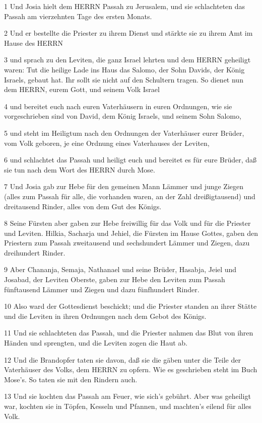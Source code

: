 \par 1 Und Josia hielt dem HERRN Passah zu Jerusalem, und sie schlachteten das Passah am vierzehnten Tage des ersten Monats.
\par 2 Und er bestellte die Priester zu ihrem Dienst und stärkte sie zu ihrem Amt im Hause des HERRN
\par 3 und sprach zu den Leviten, die ganz Israel lehrten und dem HERRN geheiligt waren: Tut die heilige Lade ins Haus das Salomo, der Sohn Davids, der König Israels, gebaut hat. Ihr sollt sie nicht auf den Schultern tragen. So dienet nun dem HERRN, eurem Gott, und seinem Volk Israel
\par 4 und bereitet euch nach euren Vaterhäusern in euren Ordnungen, wie sie vorgeschrieben sind von David, dem König Israels, und seinem Sohn Salomo,
\par 5 und steht im Heiligtum nach den Ordnungen der Vaterhäuser eurer Brüder, vom Volk geboren, je eine Ordnung eines Vaterhauses der Leviten,
\par 6 und schlachtet das Passah und heiligt euch und bereitet es für eure Brüder, daß sie tun nach dem Wort des HERRN durch Mose.
\par 7 Und Josia gab zur Hebe für den gemeinen Mann Lämmer und junge Ziegen (alles zum Passah für alle, die vorhanden waren, an der Zahl dreißigtausend) und dreitausend Rinder, alles von dem Gut des Königs.
\par 8 Seine Fürsten aber gaben zur Hebe freiwillig für das Volk und für die Priester und Leviten. Hilkia, Sacharja und Jehiel, die Fürsten im Hause Gottes, gaben den Priestern zum Passah zweitausend und sechshundert Lämmer und Ziegen, dazu dreihundert Rinder.
\par 9 Aber Chananja, Semaja, Nathanael und seine Brüder, Hasabja, Jeiel und Josabad, der Leviten Oberste, gaben zur Hebe den Leviten zum Passah fünftausend Lämmer und Ziegen und dazu fünfhundert Rinder.
\par 10 Also ward der Gottesdienst beschickt; und die Priester standen an ihrer Stätte und die Leviten in ihren Ordnungen nach dem Gebot des Königs.
\par 11 Und sie schlachteten das Passah, und die Priester nahmen das Blut von ihren Händen und sprengten, und die Leviten zogen die Haut ab.
\par 12 Und die Brandopfer taten sie davon, daß sie die gäben unter die Teile der Vaterhäuser des Volks, dem HERRN zu opfern. Wie es geschrieben steht im Buch Mose's. So taten sie mit den Rindern auch.
\par 13 Und sie kochten das Passah am Feuer, wie sich's gebührt. Aber was geheiligt war, kochten sie in Töpfen, Kesseln und Pfannen, und machten's eilend für alles Volk.
